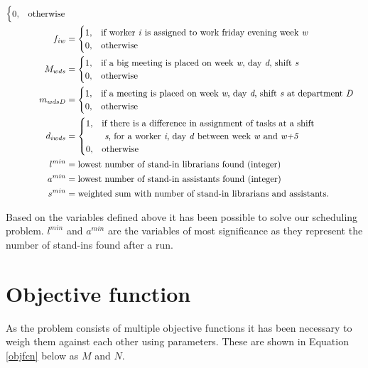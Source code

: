 \begin{align}
\begin{cases}
 		0, & \text{otherwise}
	\end{cases}
	\\
	f_{iw}&=
	\begin{cases}
 		1, & \text{if worker \textit{i} is assigned to work friday evening week \textit{w}} \\
 		0, & \text{otherwise}
	\end{cases}	
	\\
	M_{wds}&=
	\begin{cases}
	 	1, & \text{if a big meeting is placed on week \textit{w}, day \textit{d}, shift \textit{s}} \\
	 	0, & \text{otherwise}
	\end{cases}
	\\
	m_{wdsD}&=
	\begin{cases}
	 	1, & \text{if a meeting is placed on week \textit{w}, day \textit{d}, shift \textit{s} at department \textit{D}} \\
	 	0, & \text{otherwise}
	\end{cases}
	\\
	d_{iwds}&=
	\begin{cases}
	 	1, & \text{if there is a difference in assignment of tasks at a shift}\\
	 		& \text{ \textit{s}, for a worker \textit{i}, day \textit{d} between week \textit{w} and \textit{w+5}} \\
	 	0, & \text{otherwise}
	\end{cases}
	\\
	l^{min}&= \text{lowest number of stand-in librarians found (integer)} \\
	a^{min}&= \text{lowest number of stand-in assistants found (integer)} \\
	s^{min}&= \text{weighted sum with number of stand-in librarians and assistants}.
\end{align}

Based on the variables defined above it has been possible to solve our scheduling problem. \textit{$l^{min}$} and \textit{$a^{min}$} are the variables of most significance as they represent the number of stand-ins found after a run. 

\section{Objective function} \label{section:obj}
As the problem consists of multiple objective functions it has been necessary to weigh them against each other using parameters. These are shown in Equation \ref{objfcn} below as $M$ and $N$.

